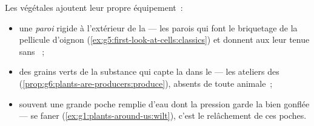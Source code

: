\begin{proposition}\label{prop:g6:cell-unit-of-life:plantextras}
Les  végétales ajoutent leur propre équipement~:
\begin{itemize}
  \item une \emph{paroi} rigide à
        l'extérieur de la  --- les parois qui font le
        briquetage de la pellicule d'oignon
        (\cref{ex:g5:first-look-at-cells:classics}) et donnent aux
         leur tenue sans ~;
  \item des grains verts de la substance qui capte la  dans
        le  --- les ateliers des 
        (\cref{prop:g6:plants-are-producers:produce}), absents de
        toute  animale~;
  \item souvent une grande poche remplie d'eau dont la pression
        garde la  bien gonflée --- se faner
        (\cref{ex:g1:plants-around-us:wilt}), c'est le relâchement
        de ces poches.
\end{itemize}
\end{proposition}
\admitted

